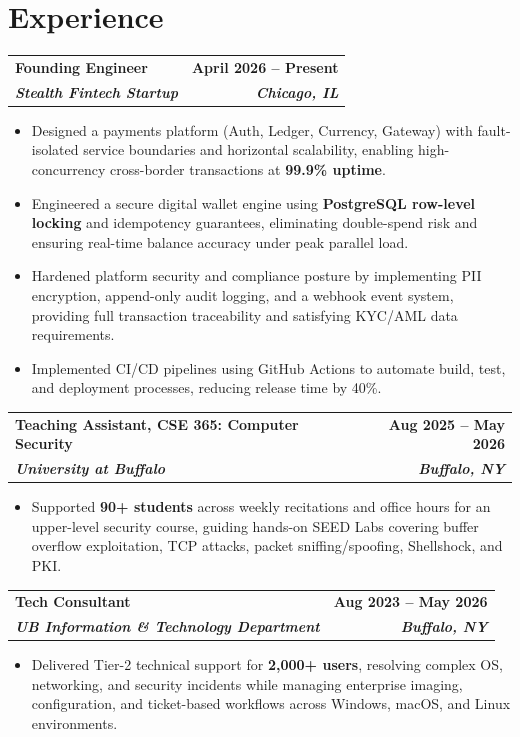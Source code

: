 \documentclass[letterpaper,10.5pt]{article}
\makeatletter
\newcommand{\roleheading}[4]{%
  \vspace{2pt}%
  \begin{tabular*}{\textwidth}[t]{l@{\extracolsep{\fill}}r}
    \textbf{#1} & \textbf{\small #2} \\
    \textbf{\textit{\small #3}} & \textbf{\textit{\small #4}} \\
  \end{tabular*}%
}
\newcommand{\bul}[1]{%
  \item \small{#1}\vspace{-1pt}%
}
\newcommand{\bullist}{\begin{itemize}[leftmargin=12pt, label={\tiny$\bullet$}, topsep=1pt, itemsep=0pt, parsep=0pt]}
\newcommand{\stopbulls}{\end{itemize}\vspace{-2.75pt}}
\makeatother
\begin{document}
\vspace{-7pt}

\section{Experience}
\vspace{-2pt}
\roleheading{Founding Engineer}{April 2026 -- Present}{Stealth Fintech Startup}{Chicago, IL}
\bullist
  \bul{Designed a payments platform (Auth, Ledger, Currency, Gateway) with fault-isolated service boundaries and horizontal scalability, enabling high-concurrency cross-border transactions at \textbf{99.9\% uptime}.}
  \bul{Engineered a secure digital wallet engine using \textbf{PostgreSQL row-level locking} and idempotency guarantees, eliminating double-spend risk and ensuring real-time balance accuracy under peak parallel load.}
  \bul{Hardened platform security and compliance posture by implementing PII encryption, append-only audit logging, and a webhook event system, providing full transaction traceability and satisfying KYC/AML data requirements.}
  \bul{Implemented CI/CD pipelines using GitHub Actions to automate build, test, and deployment processes, reducing release time by 40\%.}
\stopbulls
\vspace{3pt}

\roleheading{Teaching Assistant, CSE 365: Computer Security}{Aug 2025 -- May 2026}{University at Buffalo}{Buffalo, NY}
\bullist
  \bul{Supported \textbf{90+ students} across weekly recitations and office hours for an upper-level security course, guiding hands-on SEED Labs covering buffer overflow exploitation, TCP attacks, packet sniffing/spoofing, Shellshock, and PKI.}
\stopbulls
\vspace{3pt}

\roleheading{Tech Consultant}{Aug 2023 -- May 2026}{UB Information \& Technology Department}{Buffalo, NY}
\bullist
  \bul{Delivered Tier-2 technical support for \textbf{2,000+ users}, resolving complex OS, networking, and security incidents while managing enterprise imaging, configuration, and ticket-based workflows across Windows, macOS, and Linux environments.}
\stopbulls
\vspace{3pt}
\end{document}
